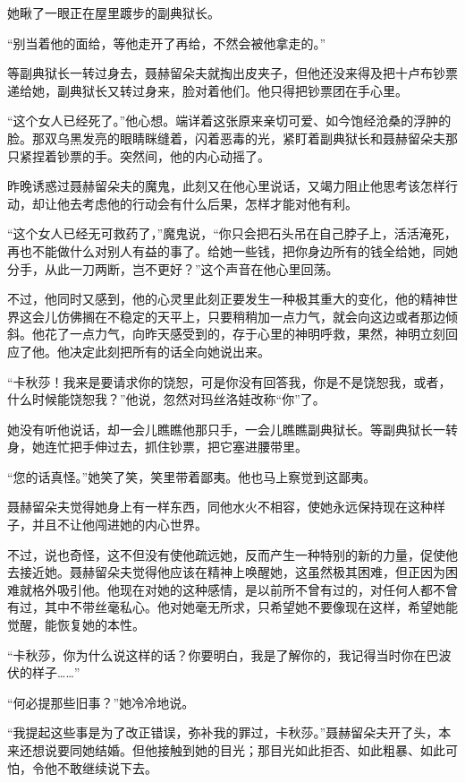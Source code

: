 \documentclass[12pt,UTF-8,openany]{ctexbook}
\begin{document}
\begin{large}
    她瞅了一眼正在屋里踱步的副典狱长。
    
    “别当着他的面给，等他走开了再给，不然会被他拿走的。”
    
    等副典狱长一转过身去，聂赫留朵夫就掏出皮夹子，但他还没来得及把十卢布钞票递给她，副典狱长又转过身来，脸对着他们。他只得把钞票团在手心里。
    
    “这个女人已经死了。”他心想。端详着这张原来亲切可爱、如今饱经沧桑的浮肿的脸。那双乌黑发亮的眼睛眯缝着，闪着恶毒的光，紧盯着副典狱长和聂赫留朵夫那只紧捏着钞票的手。突然间，他的内心动摇了。
    
    昨晚诱惑过聂赫留朵夫的魔鬼，此刻又在他心里说话，又竭力阻止他思考该怎样行动，却让他去考虑他的行动会有什么后果，怎样才能对他有利。
    
    “这个女人已经无可救药了，”魔鬼说，“你只会把石头吊在自己脖子上，活活淹死，再也不能做什么对别人有益的事了。给她一些钱，把你身边所有的钱全给她，同她分手，从此一刀两断，岂不更好？”这个声音在他心里回荡。
    
    不过，他同时又感到，他的心灵里此刻正要发生一种极其重大的变化，他的精神世界这会儿仿佛搁在不稳定的天平上，只要稍稍加一点力气，就会向这边或者那边倾斜。他花了一点力气，向昨天感受到的，存于心里的神明呼救，果然，神明立刻回应了他。他决定此刻把所有的话全向她说出来。
    
    “卡秋莎！我来是要请求你的饶恕，可是你没有回答我，你是不是饶恕我，或者，什么时候能饶恕我？”他说，忽然对玛丝洛娃改称“你”了。
    
    她没有听他说话，却一会儿瞧瞧他那只手，一会儿瞧瞧副典狱长。等副典狱长一转身，她连忙把手伸过去，抓住钞票，把它塞进腰带里。
    
    “您的话真怪。”她笑了笑，笑里带着鄙夷。他也马上察觉到这鄙夷。
    
    聂赫留朵夫觉得她身上有一样东西，同他水火不相容，使她永远保持现在这种样子，并且不让他闯进她的内心世界。
    
    不过，说也奇怪，这不但没有使他疏远她，反而产生一种特别的新的力量，促使他去接近她。聂赫留朵夫觉得他应该在精神上唤醒她，这虽然极其困难，但正因为困难就格外吸引他。他现在对她的这种感情，是以前所不曾有过的，对任何人都不曾有过，其中不带丝毫私心。他对她毫无所求，只希望她不要像现在这样，希望她能觉醒，能恢复她的本性。
    
    “卡秋莎，你为什么说这样的话？你要明白，我是了解你的，我记得当时你在巴波伏的样子……”
    
    “何必提那些旧事？”她冷冷地说。
    
    “我提起这些事是为了改正错误，弥补我的罪过，卡秋莎。”聂赫留朵夫开了头，本来还想说要同她结婚。但他接触到她的目光；那目光如此拒否、如此粗暴、如此可怕，令他不敢继续说下去。
    

\end{large}
\end{document}
